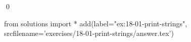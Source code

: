 
\begin{ex}
  \label{ex:18-01-print-strings}
  
  \qed
\end{ex}
\begin{python0}
from solutions import *
add(label="ex:18-01-print-strings",
    srcfilename='exercises/18-01-print-strings/answer.tex')
\end{python0}
